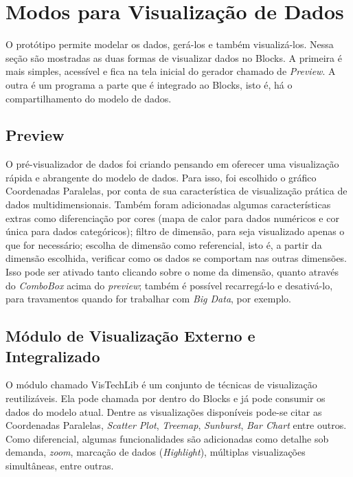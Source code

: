 \documentclass[
	12pt,				%
	openright,			%
	twoside,			%
	a4paper,			%
	english,			%
	brazil				%
	]{abntex2}
\begin{document}
	\section{Modos para Visualização de Dados}
		O protótipo permite modelar os dados, gerá-los e também visualizá-los.
		Nessa seção são mostradas as duas formas de visualizar dados no Blocks.
		A primeira é mais simples, acessível e fica na tela inicial do gerador chamado de \emph{Preview}.
		A outra é um programa a parte que é integrado ao Blocks, isto é, há o compartilhamento do modelo de dados.

		\subsection{Preview}
			O pré-visualizador de dados foi criando pensando em oferecer uma visualização rápida e abrangente do modelo de dados.
			Para isso, foi escolhido o gráfico Coordenadas Paralelas, por conta de sua característica de visualização prática de dados multidimensionais.
			Também foram adicionadas algumas características extras como diferenciação por cores (mapa de calor para dados numéricos e cor única para dados categóricos); 
				filtro de dimensão, para seja visualizado apenas o que for necessário;
				escolha de dimensão como referencial, isto é, a partir da dimensão escolhida, verificar como os dados se comportam nas outras dimensões. Isso pode ser ativado tanto clicando sobre o nome da dimensão, quanto através do \emph{ComboBox} acima do \emph{preview};
				também é possível recarregá-lo e desativá-lo, para travamentos quando for trabalhar com \emph{Big Data}, por exemplo.

		\subsection{Módulo de Visualização Externo e Integralizado}
			O módulo chamado VisTechLib é um conjunto de técnicas de visualização reutilizáveis.
			Ela pode chamada por dentro do Blocks e já pode consumir os dados do modelo atual.
			Dentre as visualizações disponíveis pode-se citar as Coordenadas Paralelas, \emph{Scatter Plot}, \emph{Treemap}, \emph{Sunburst}, \emph{Bar Chart} entre outros.
			Como diferencial, algumas funcionalidades são adicionadas como detalhe sob demanda, \emph{zoom}, marcação de dados (\emph{Highlight}), múltiplas visualizações simultâneas, entre outras.
	
\end{document}
